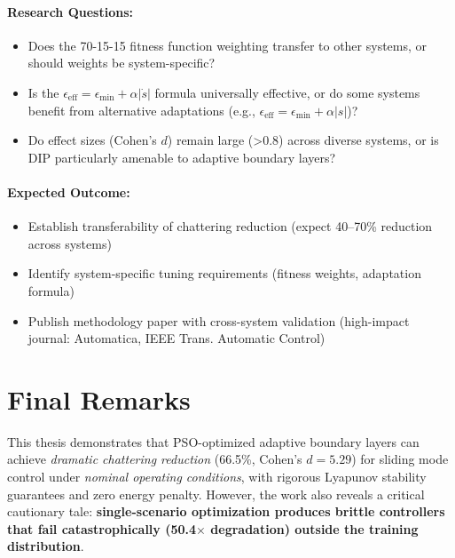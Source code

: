 \paragraph{Research Questions:}
\begin{itemize}
    \item Does the 70-15-15 fitness function weighting transfer to other systems, or should weights be system-specific?
    \item Is the $\epsilon_{\text{eff}} = \epsilon_{\min} + \alpha|\dot{s}|$ formula universally effective, or do some systems benefit from alternative adaptations (e.g., $\epsilon_{\text{eff}} = \epsilon_{\min} + \alpha|s|$)?
    \item Do effect sizes (Cohen's $d$) remain large (>0.8) across diverse systems, or is DIP particularly amenable to adaptive boundary layers?
\end{itemize}

\paragraph{Expected Outcome:}
\begin{itemize}
    \item Establish transferability of chattering reduction (expect 40--70\% reduction across systems)
    \item Identify system-specific tuning requirements (fitness weights, adaptation formula)
    \item Publish methodology paper with cross-system validation (high-impact journal: Automatica, IEEE Trans. Automatic Control)
\end{itemize}

\section{Final Remarks}
\label{sec:conclusions_final_remarks}

This thesis demonstrates that PSO-optimized adaptive boundary layers can achieve \textit{dramatic chattering reduction} (66.5\%, Cohen's $d = 5.29$) for sliding mode control under \textit{nominal operating conditions}, with rigorous Lyapunov stability guarantees and zero energy penalty. However, the work also reveals a critical cautionary tale: \textbf{single-scenario optimization produces brittle controllers that fail catastrophically (50.4$\times$ degradation) outside the training distribution}.

